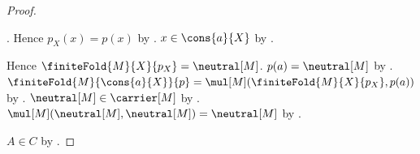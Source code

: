 \begin{proof}
\begin{subproof}
\begin{subproof}
\begin{byCase}
\begin{subproof}
                        .
                    Hence $p_X(x)=p(x)$ by
                        .
                    $x\in\cons{a}{X}$ by .
                \end{subproof}
                Hence $\finiteFold{M}{X}{p_X}=\neutral[M]$.
                $p(a)=\neutral[M]$ by .
                $\finiteFold{M}{\cons{a}{X}}{p}
                    =\mul[M](\finiteFold{M}{X}{p_X},p(a))$ by
                    .
                $\neutral[M]\in\carrier[M]$ by
                    .
                $\mul[M](\neutral[M],\neutral[M])=\neutral[M]$ by
                    .
            \end{byCase}
        \end{subproof}
    \end{subproof}
    $A\in C$ by .
\end{proof}


